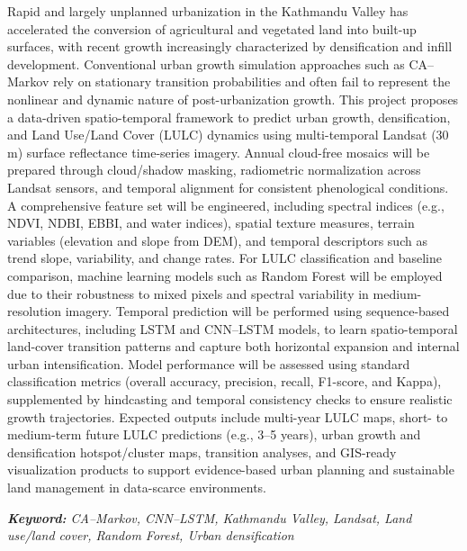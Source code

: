 \documentclass[main]{subfiles}
\begin{document}

Rapid and largely unplanned urbanization in the Kathmandu Valley has accelerated the conversion of agricultural and vegetated land into built-up surfaces, with recent growth increasingly characterized by densification and infill development. Conventional urban growth simulation approaches such as CA–Markov rely on stationary transition probabilities and often fail to represent the nonlinear and dynamic nature of post-urbanization growth. This project proposes a data-driven spatio-temporal framework to predict urban growth, densification, and Land Use/Land Cover (LULC) dynamics using multi-temporal Landsat (30 m) surface reflectance time-series imagery. Annual cloud-free mosaics will be prepared through cloud/shadow masking, radiometric normalization across Landsat sensors, and temporal alignment for consistent phenological conditions. A comprehensive feature set will be engineered, including spectral indices (e.g., NDVI, NDBI, EBBI, and water indices), spatial texture measures, terrain variables (elevation and slope from DEM), and temporal descriptors such as trend slope, variability, and change rates. For LULC classification and baseline comparison, machine learning models such as Random Forest will be employed due to their robustness to mixed pixels and spectral variability in medium-resolution imagery. Temporal prediction will be performed using sequence-based architectures, including LSTM and CNN–LSTM models, to learn spatio-temporal land-cover transition patterns and capture both horizontal expansion and internal urban intensification. Model performance will be assessed using standard classification metrics (overall accuracy, precision, recall, F1-score, and Kappa), supplemented by hindcasting and temporal consistency checks to ensure realistic growth trajectories. Expected outputs include multi-year LULC maps, short- to medium-term future LULC predictions (e.g., 3–5 years), urban growth and densification hotspot/cluster maps, transition analyses, and GIS-ready visualization products to support evidence-based urban planning and sustainable land management in data-scarce environments.

\textit{
\textbf{Keyword:} CA–Markov, CNN–LSTM, Kathmandu Valley, Landsat, Land use/land cover, Random Forest, Urban densification
}
\end{document}
